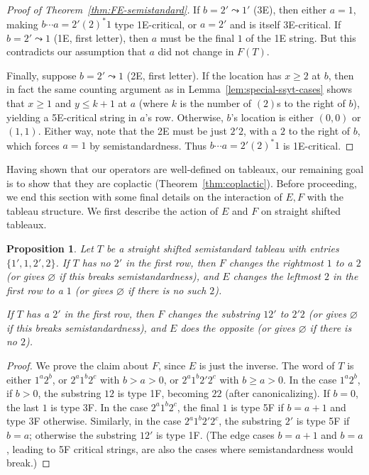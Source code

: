 \documentclass[10pt]{amsart}
\newtheorem{prop}[theorem]{Proposition}
\theoremstyle{definition}
\begin{document}
\begin{proof}[Proof of Theorem~\ref{thm:FE-semistandard}]
If $b = 2' \leadsto 1'$ (3E), then either $a=1$, making $b \cdots a = 2' (2)^*1$ type 1E-critical, or $a=2'$ and is itself 3E-critical. If $b = 2' \leadsto 1$ (1E, first letter), then $a$ must be the final $1$ of the 1E string. But this contradicts our assumption that $a$ did not change in $F(T)$.

Finally, suppose $b = 2' \leadsto 1$ (2E, first letter). If the location has $x \geq 2$ at $b$, then in fact the same counting argument as in Lemma~\ref{lem:special-ssyt-cases} 
shows that $x \geq 1$ and $y \leq k+1$ at $a$ (where $k$ is the number of $(2)$s to the right of $b$), yielding a 5E-critical string in $a$'s row. Otherwise, $b$'s location is either $(0,0)$ or $(1,1)$. Either way, note that the 2E must be just $2'2$, with a $2$ to the right of $b$, which forces $a=1$ by semistandardness. Thus $b\cdots a = 2'(2)^*1$ is 1E-critical.
\end{proof}

Having shown that our operators are well-defined on tableaux, our remaining goal is to show that they are coplactic (Theorem~\ref{thm:coplactic}). Before proceeding, we end this section with some final details on the interaction of $E,F$ with the tableau structure. We first describe the action of $E$ and $F$ on straight shifted tableaux.

\begin{prop} \label{prop:rect-unprimed-action} Let $T$ be a straight shifted semistandard tableau with entries $\{1',1,2',2\}$. If $T$ has no $2'$ in the first row, then $F$ changes the rightmost $1$ to a $2$ \textup{(}or gives $\varnothing$ if this breaks semistandardness\textup{)}, and $E$ changes the leftmost $2$ in the first row to a $1$ \textup{(}or gives $\varnothing$ if there is no such $2$\textup{)}.

If $T$ has a $2'$ in the first row, then $F$ changes the substring $12'$ to $2'2$ \textup{(}or gives $\varnothing$ if this breaks semistandardness\textup{)}, and $E$ does the opposite \textup{(}or gives $\varnothing$ if there is no $2$\textup{)}.
\end{prop}

\begin{proof}
We prove the claim about $F$, since $E$ is just the inverse. The word of $T$ is either $1^a2^b$, or $2^a1^b2^c$ with $b>a>0$, or $2^a1^b2'2^c$ with $b \geq a > 0$. In the case $1^a2^b$, if $b>0$, the substring $12$ is type 1F, becoming $22$ (after canonicalizing). If $b=0$, the last $1$ is type 3F. In the case $2^a1^b2^c$, the final $1$ is type 5F if $b=a+1$ and type 3F otherwise. Similarly, in the case $2^a1^b2'2^c$, the substring $2'$ is type 5F if $b=a$; otherwise the substring $12'$ is type 1F. (The edge cases $b=a+1$ and $b=a$, leading to 5F critical strings, are also the cases where semistandardness would break.)
\end{proof}
\end{document}
